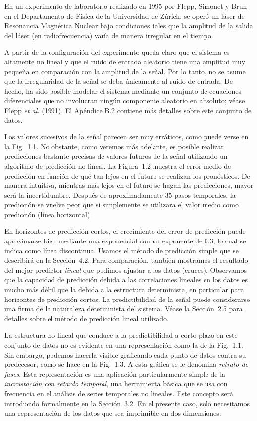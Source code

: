 \documentclass[10pt,a4paper]{book}
\begin{document}
En un experimento de laboratorio realizado en 1995 por Flepp, Simonet y Brun en el Departamento de Física de la Universidad de Zúrich, se operó un láser de Resonancia Magnética Nuclear bajo condiciones tales que la amplitud de la salida del láser (en radiofrecuencia) varía de manera irregular en el tiempo. 

A partir de la configuración del experimento queda claro que el sistema es altamente no lineal y que el ruido de entrada aleatorio tiene una amplitud muy pequeña en comparación con la amplitud de la señal. Por lo tanto, no se asume que la irregularidad de la señal se deba únicamente al ruido de entrada. De hecho, ha sido posible modelar el sistema mediante un conjunto de ecuaciones diferenciales que no involucran ningún componente aleatorio en absoluto; véase Flepp \emph{et al.} (1991). El Apéndice B.2 contiene más detalles sobre este conjunto de datos.

Los valores sucesivos de la señal parecen ser muy erráticos, como puede verse en la Fig.~1.1. No obstante, como veremos más adelante, es posible realizar predicciones bastante precisas de valores futuros de la señal utilizando un algoritmo de predicción no lineal. La Figura~1.2 muestra el error medio de predicción en función de qué tan lejos en el futuro se realizan los pronósticos. De manera intuitiva, mientras más lejos en el futuro se hagan las predicciones, mayor será la incertidumbre. Después de aproximadamente 35 pasos temporales, la predicción se vuelve peor que si simplemente se utilizara el valor medio como predicción (línea horizontal). 

En horizontes de predicción cortos, el crecimiento del error de predicción puede aproximarse bien mediante una exponencial con un exponente de 0.3, lo cual se indica como línea discontinua. Usamos el método de predicción simple que se describirá en la Sección~4.2. Para comparación, también mostramos el resultado del mejor predictor \emph{lineal} que pudimos ajustar a los datos (cruces). Observamos que la capacidad de predicción debida a las correlaciones lineales en los datos es mucho más débil que la debida a la estructura determinista, en particular para horizontes de predicción cortos. La predictibilidad de la señal puede considerarse una firma de la naturaleza determinista del sistema. Véase la Sección~2.5 para detalles sobre el método de predicción lineal utilizado.

La estructura no lineal que conduce a la predictibilidad a corto plazo en este conjunto de datos no es evidente en una representación como la de la Fig.~1.1. Sin embargo, podemos hacerla visible graficando cada punto de datos contra su predecesor, como se hace en la Fig.~1.3. A esta gráfica se le denomina \emph{retrato de fases}. Esta representación es una aplicación particularmente simple de la \emph{incrustación con retardo temporal}, una herramienta básica que se usa con frecuencia en el análisis de series temporales no lineales. Este concepto será introducido formalmente en la Sección~3.2. En el presente caso, solo necesitamos una representación de los datos que sea imprimible en dos dimensiones.
\end{document}
